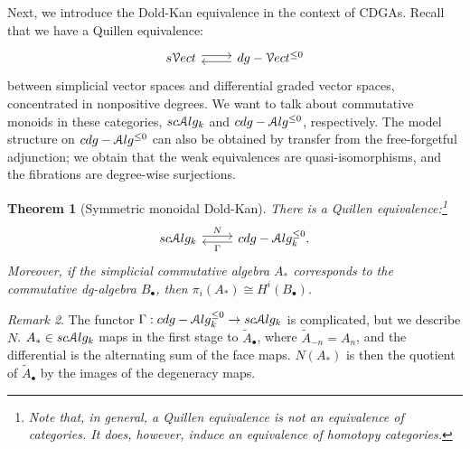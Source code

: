 \documentclass[10pt,a4paper,reqno,oneside]{book} %
\theoremstyle{plain}
\newtheorem{thm}{Theorem}[section]
\theoremstyle{definition}
\theoremstyle{remark}
\newtheorem{rem}[thm]{Remark}
\numberwithin{equation}{section}
\begin{document}
Next, we introduce the Dold-Kan equivalence in the context of CDGAs. Recall that we have a Quillen equivalence:
\[
\begin{tikzcd}
	s\cV ect \arrow[shift left]{r} & dg-\cV ect^{\leq 0} \arrow[shift left]{l}
\end{tikzcd}
\]
between simplicial vector spaces and differential graded vector spaces, concentrated in nonpositive degrees. We want to
talk about commutative monoids in these categories, $sc\mathcal A lg_k$ and $cdg-\mathcal A lg^{\leq 0}$, respectively.
The model structure on $cdg-\mathcal A lg^{\leq 0}$ can also be obtained by transfer from the free-forgetful adjunction; we obtain
that the weak equivalences are quasi-isomorphisms, and the fibrations are degree-wise surjections.

\begin{thm}[Symmetric monoidal Dold-Kan]
There is a Quillen equivalence:\footnote{Note that, in general, a Quillen equivalence is not an equivalence of categories.
It does, however, induce an equivalence of homotopy categories.}
\[
\begin{tikzcd}
	sc\cA lg_k \arrow[shift left]{r}{N} & cdg-\cA lg_k^{\leq 0} \arrow[shift left]{l}{\Gamma}.	
\end{tikzcd}
\]
Moreover, if the simplicial commutative algebra $A_*$ corresponds to the commutative dg-algebra $B_{\bullet}$, then
$\pi_i(A_*) \cong H^i(B_{\bullet})$.
\end{thm}


\begin{rem}
The functor $\Gamma : cdg-\mathcal A lg_k^{\leq 0} \to sc\mathcal A lg_k $ is complicated, but we describe $N$.
$A_* \in sc\mathcal A lg_k$ maps in the first stage to $\tilde A_{\bullet}$, where $\tilde A_{-n} = A_n$, and the differential 
is the alternating sum of the face maps.
$N(A_*)$ is then the quotient of $\tilde A_{\bullet}$ by the images of the degeneracy maps.
\end{rem}


\end{document}
